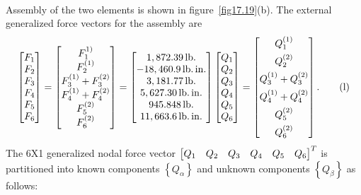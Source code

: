 \documentclass{AeroStructure-ERJohnson}
\begin{document}
\begin{example}
\begin{gather}
\end{gather}
Assembly of the two elements is shown in figure~\ref{fig17.19}(b). The external generalized force vectors for the assembly are
\begin{equation}
\left[\begin{array}{@{}c@{}}F_{1} \\
F_{2} \\
F_{3} \\
F_{4} \\
F_{5} \\
F_{6}\end{array}\right]=\left[\begin{array}{@{}c@{}}F_{1}^{1)} \\
F_{2}^{(1)} \\
F_{3}^{(1)}+F_{3}^{(2)} \\
F_{4}^{(1)}+F_{4}^{(2)} \\
F_{5}^{(2)} \\
F_{6}^{(2)}\end{array}\right]=\left[\begin{array}{@{}c@{}}1,872.39\,\mathrm{lb}. \\
-18,460.9\,\mathrm{lb}.\,\mathrm{in}. \\
3,181.77\,\mathrm{lb}. \\
5,627.30\,\mathrm{lb}.\,\mathrm{in}. \\
945.848\,\mathrm{lb}. \\
11,663.6\,\mathrm{lb}.\,\mathrm{in}.\end{array}\right]\left[\begin{array}{@{}c@{}}Q_{1} \\
Q_{2} \\
Q_{3} \\
Q_{4} \\
Q_{5} \\
Q_{6}\end{array}\right]=\left[\begin{array}{@{}c@{}}Q_{1}^{(1)} \\[4pt]
Q_{2}^{(2)} \\[4pt]
Q_{3}^{(1)}+Q_{3}^{(2)} \\[4pt]
Q_{4}^{(1)}+Q_{4}^{(2)} \\[4pt]
Q_{5}^{(2)} \\[4pt]
Q_{6}^{(2)}\end{array}\right]. \label{eq17.5.l}\tag{l}
\end{equation}
The 6X1 generalized nodal force vector $\left[\begin{array}{@{}llllll@{}}Q_{1} & Q_{2} & Q_{3} & Q_{4} & Q_{5} & Q_{6}\end{array}\right]^{T}$ is partitioned into known components $\left\{Q_{\alpha}\right\}$ and unknown components $\left\{Q_{\beta}\right\}$ as follows:

\end{example}
\end{document}
